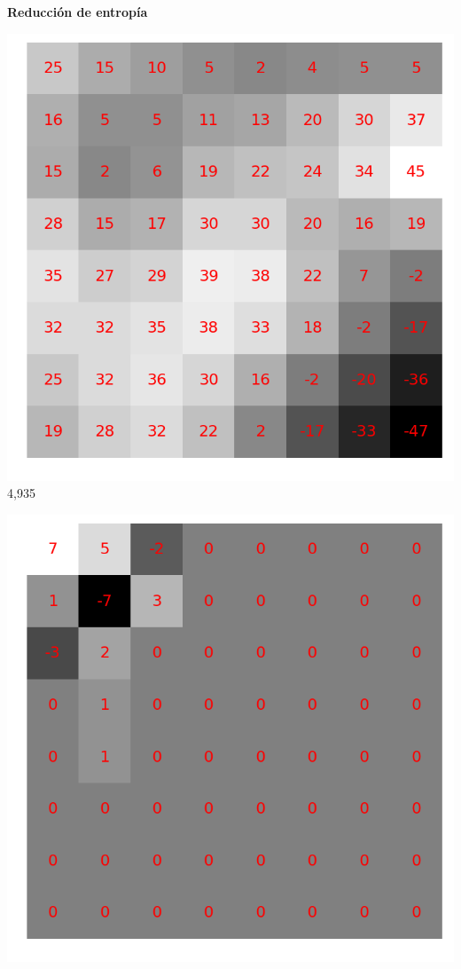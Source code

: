 \documentclass{beamer}
\begin{document}
\begin{frame}
    \textbf{Reducción de entropía}

    \begin{minipage}[t]{0.42\linewidth}
        \begin{center}
            \includegraphics[scale=0.2]{fig/8x8random_entropy.png}\\
            4,935
        \end{center}
    \end{minipage}
    \hfill
    \begin{minipage}[t]{0.42\linewidth}
        \begin{center}
            \includegraphics[scale=0.2]{fig/8x8random_dct_entropy.png}\\

\end{center}
\end{minipage}
\end{frame}
\end{document}
